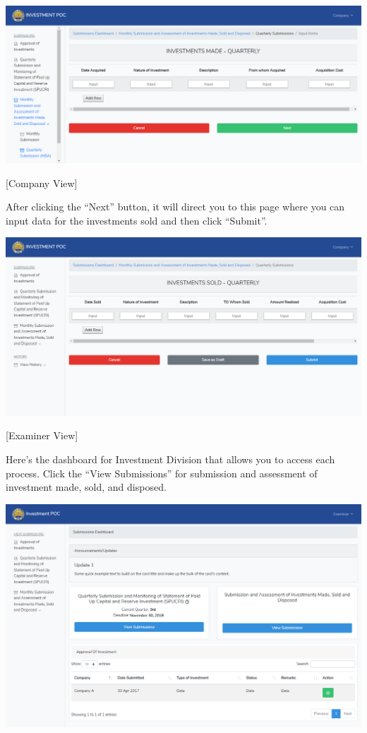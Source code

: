 \documentclass{article}
\begin{document}
\includegraphics[keepaspectratio=true]{up-ic-screens/image37}{}%

[Company View]%

After clicking the “Next” button, it will direct
you to this page where you can input data for the investments sold and
then click “Submit”.%

\includegraphics[keepaspectratio=true]{up-ic-screens/image181}{}%

[Examiner View]%

Here’s the dashboard for Investment Division that
allows you to access each process. Click the “View Submissions” for
submission and assessment of investment made, sold, and
disposed.%

\includegraphics[keepaspectratio=true]{up-ic-screens/image44}{}%
\end{document}
